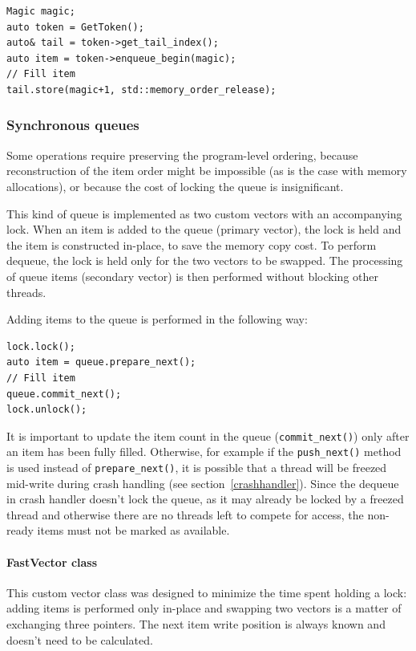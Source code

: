 \documentclass[hidelinks,titlepage,a4paper]{article}
\begin{document}
\begin{lstlisting}
Magic magic;
auto token = GetToken();
auto& tail = token->get_tail_index();
auto item = token->enqueue_begin(magic);
// Fill item
tail.store(magic+1, std::memory_order_release);
\end{lstlisting}

\subsubsection{Synchronous queues}

Some operations require preserving the program-level ordering, because reconstruction of the item order might be impossible (as is the case with memory allocations), or because the cost of locking the queue is insignificant.

This kind of queue is implemented as two custom vectors with an accompanying lock. When an item is added to the queue (primary vector), the lock is held and the item is constructed in-place, to save the memory copy cost. To perform dequeue, the lock is held only for the two vectors to be swapped. The processing of queue items (secondary vector) is then performed without blocking other threads.

Adding items to the queue is performed in the following way:

\begin{lstlisting}
lock.lock();
auto item = queue.prepare_next();
// Fill item
queue.commit_next();
lock.unlock();
\end{lstlisting}

It is important to update the item count in the queue (\texttt{commit\_next()}) only after an item has been fully filled. Otherwise, for example if the \texttt{push\_next()} method is used instead of \texttt{prepare\_next()}, it is possible that a thread will be freezed mid-write during crash handling (see section~\ref{crashhandler}). Since the dequeue in crash handler doesn't lock the queue, as it may already be locked by a freezed thread and otherwise there are no threads left to compete for access, the non-ready items must not be marked as available.

\paragraph{FastVector class}

This custom vector class was designed to minimize the time spent holding a lock: adding items is performed only in-place and swapping two vectors is a matter of exchanging three pointers. The next item write position is always known and doesn't need to be calculated.
\end{document}
